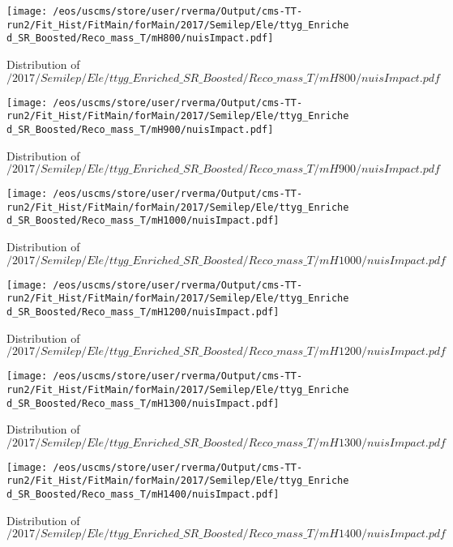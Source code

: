 \begin{figure}
\centering
\texttt{[image: /eos/uscms/store/user/rverma/Output/cms-TT-run2/Fit\_Hist/FitMain/forMain/2017/Semilep/Ele/ttyg\_Enriched\_SR\_Boosted/Reco\_mass\_T/mH800/nuisImpact.pdf]}
\caption{Distribution of $/2017/Semilep/Ele/ttyg\_Enriched\_SR\_Boosted/Reco\_mass\_T/mH800/nuisImpact.pdf$}
\end{figure}

\begin{figure}
\centering
\texttt{[image: /eos/uscms/store/user/rverma/Output/cms-TT-run2/Fit\_Hist/FitMain/forMain/2017/Semilep/Ele/ttyg\_Enriched\_SR\_Boosted/Reco\_mass\_T/mH900/nuisImpact.pdf]}
\caption{Distribution of $/2017/Semilep/Ele/ttyg\_Enriched\_SR\_Boosted/Reco\_mass\_T/mH900/nuisImpact.pdf$}
\end{figure}

\begin{figure}
\centering
\texttt{[image: /eos/uscms/store/user/rverma/Output/cms-TT-run2/Fit\_Hist/FitMain/forMain/2017/Semilep/Ele/ttyg\_Enriched\_SR\_Boosted/Reco\_mass\_T/mH1000/nuisImpact.pdf]}
\caption{Distribution of $/2017/Semilep/Ele/ttyg\_Enriched\_SR\_Boosted/Reco\_mass\_T/mH1000/nuisImpact.pdf$}
\end{figure}

\begin{figure}
\centering
\texttt{[image: /eos/uscms/store/user/rverma/Output/cms-TT-run2/Fit\_Hist/FitMain/forMain/2017/Semilep/Ele/ttyg\_Enriched\_SR\_Boosted/Reco\_mass\_T/mH1200/nuisImpact.pdf]}
\caption{Distribution of $/2017/Semilep/Ele/ttyg\_Enriched\_SR\_Boosted/Reco\_mass\_T/mH1200/nuisImpact.pdf$}
\end{figure}

\begin{figure}
\centering
\texttt{[image: /eos/uscms/store/user/rverma/Output/cms-TT-run2/Fit\_Hist/FitMain/forMain/2017/Semilep/Ele/ttyg\_Enriched\_SR\_Boosted/Reco\_mass\_T/mH1300/nuisImpact.pdf]}
\caption{Distribution of $/2017/Semilep/Ele/ttyg\_Enriched\_SR\_Boosted/Reco\_mass\_T/mH1300/nuisImpact.pdf$}
\end{figure}

\begin{figure}
\centering
\texttt{[image: /eos/uscms/store/user/rverma/Output/cms-TT-run2/Fit\_Hist/FitMain/forMain/2017/Semilep/Ele/ttyg\_Enriched\_SR\_Boosted/Reco\_mass\_T/mH1400/nuisImpact.pdf]}
\caption{Distribution of $/2017/Semilep/Ele/ttyg\_Enriched\_SR\_Boosted/Reco\_mass\_T/mH1400/nuisImpact.pdf$}
\end{figure}

